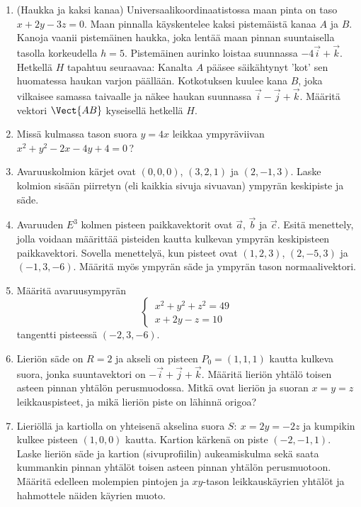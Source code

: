 \begin{enumerate}
\item {} 
(Haukka ja kaksi kanaa) Universaalikoordinaatistossa maan pinta on 
taso $x+2y-3z=0$. Maan pinnalla käyskentelee kaksi pistemäistä kanaa $A$ ja 
$B$. Kanoja vaanii pistemäinen haukka, joka lentää maan pinnan suuntaisella
tasolla korkeudella $h=5$. Pistemäinen aurinko loistaa suunnassa
$-4\vec i +\vec k $. Hetkellä $H$ tapahtuu seuraavaa: Kanalta $A$ pääsee säikähtynyt 
'kot' sen huomatessa haukan varjon päällään. Kotkotuksen kuulee kana $B$,
joka vilkaisee samassa taivaalle ja näkee haukan suunnassa $\vec i -\vec j +\vec k $.
Määritä vektori $\Vect{AB}$ kyseisellä hetkellä $H$.

\item
Missä kulmassa tason suora $y=4x$ leikkaa ympyräviivan \newline
$x^2+y^2-2x-4y+4=0$\,?

\item
Avaruuskolmion kärjet ovat $(0,0,0)$, $(3,2,1)$ ja $(2,-1,3)$. Laske kolmion sisään piirretyn
(eli kaikkia sivuja sivuavan) ympyrän keskipiste ja säde.

\item
Avaruuden $E^3$ kolmen pisteen paikkavektorit ovat $\vec a$, $\vec b$ ja $\vec c$. Esitä
menettely, jolla voidaan määrittää pisteiden kautta kulkevan ympyrän keskipisteen paikkavektori.
Sovella menettelyä, kun pisteet ovat $(1,2,3)$, $(2,-5,3)$ ja $(-1,3,-6)$. Määritä myös
ympyrän säde ja ympyrän tason normaalivektori.

\item
Määritä avaruusympyrän
\[ \begin{cases}
\,x^2+y^2+z^2=49 \\ \,x+2y-z=10
\end{cases} \]
tangentti pisteessä $(-2,3,-6)$.

\item
Lieriön säde on $R=2$ ja akseli on pisteen $P_0=(1,1,1)$ kautta kulkeva suora, jonka 
suuntavektori on $-\vec i+\vec j+\vec k$. Määritä lieriön yhtälö toisen asteen pinnan yhtälön
perusmuodossa. Mitkä ovat lieriön ja suoran $x=y=z$ leikkauspisteet, ja mikä lieriön piste on
lähinnä origoa?

\item
Lieriöllä ja kartiolla on yhteisenä akselina suora $S:\ x=2y=-2z$ ja kumpikin kulkee pisteen
$(1,0,0)$ kautta. Kartion kärkenä on piste $(-2,-1,1)$. Laske lieriön säde ja kartion
(sivuprofiilin) aukeamiskulma sekä saata kummankin pinnan yhtälöt toisen asteen pinnan
yhtälön perusmuotoon. Määritä edelleen molempien pintojen ja $xy$-tason leikkauskäyrien
yhtälöt ja hahmottele näiden käyrien muoto.


\end{enumerate}
